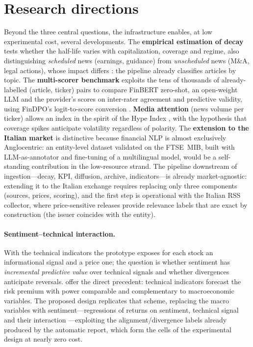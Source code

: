 \documentclass[a4paper,11pt]{article}
\begin{document}
\section{Research directions}

Beyond the three central questions, the infrastructure enables, at low experimental cost, several developments. The \textbf{empirical estimation of decay} tests whether the half-life varies with capitalization, coverage and regime, also distinguishing \emph{scheduled} news (earnings, guidance) from \emph{unscheduled} news (M\&A, legal actions), whose impact differs \parencite{boudoukh2019information}: the pipeline already classifies articles by topic. The \textbf{multi-scorer benchmark} exploits the tens of thousands of already-labelled (article, ticker) pairs to compare FinBERT zero-shot, an open-weight LLM and the provider's scores on inter-rater agreement and predictive validity, using FinDPO's logit-to-score conversion \parencite{iacovides2025findpo}. \textbf{Media attention} (news volume per ticker) allows an index in the spirit of the Hype Index \parencite{cao2025hypeindexnlpdrivenmeasure}, with the hypothesis that coverage spikes anticipate volatility regardless of polarity. The \textbf{extension to the Italian market} is distinctive because financial NLP is almost exclusively Anglocentric: an entity-level dataset validated on the FTSE~MIB, built with LLM-as-annotator and fine-tuning of a multilingual model, would be a self-standing contribution in the low-resource strand. The pipeline downstream of ingestion---decay, KPI, diffusion, archive, indicators---is already market-agnostic: extending it to the Italian exchange requires replacing only three components (sources, prices, scoring), and the first step is operational with the Italian RSS collector, where price-sensitive releases provide relevance labels that are exact by construction (the issuer coincides with the entity).

\paragraph{Sentiment--technical interaction.} With the technical indicators the prototype exposes for each stock an informational signal and a price one; the question is whether sentiment has \emph{incremental predictive value} over technical signals and whether divergences anticipate reversals. \textcite{neely2014forecasting} offer the direct precedent: technical indicators forecast the risk premium with power comparable and complementary to macroeconomic variables. The proposed design replicates that scheme, replacing the macro variables with sentiment---regressions of returns on sentiment, technical signal and their interaction \parencite{brock1992simple}---exploiting the alignment/divergence labels already produced by the automatic report, which form the cells of the experimental design at nearly zero cost.
\end{document}
